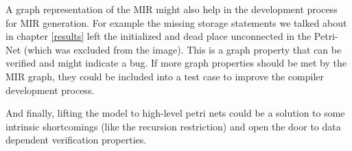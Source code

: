 A graph representation of the MIR might also help in the development process for MIR generation.
For example the missing storage statements we talked about in chapter \ref{results} left the initialized and dead place unconnected in the Petri-Net (which was excluded from the image).
This is a graph property that can be verified and might indicate a bug.
If more graph properties should be met by the MIR graph, they could be included into a test case to improve the compiler development process.

And finally, lifting the model to high-level petri nets could be a solution to some intrinsic shortcomings (like the recursion restriction) and open the door to data dependent verification properties.
